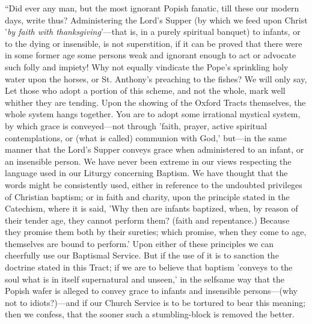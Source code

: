 ``Did ever any man, but the most ignorant Popish
fanatic, till these our modern days, write thus? Administering the
Lord's Supper (by which we feed upon Christ '\emph{by faith with
thanksgiving}'—that is, in a purely spiritual banquet) to
infants, or to the dying or insensible, is not superstition, if it can
be proved that there were in some former age some persons weak and
ignorant enough to act or advocate such folly and impiety! Why not
equally vindicate the Pope's sprinkling holy water upon the horses, or
St. Anthony's preaching to the fishes? We will only say, Let those who
adopt a portion of this scheme, and not the whole, mark well whither
they are tending. Upon the showing of the Oxford Tracts themselves,
the whole system hangs together. You are to adopt some irrational
mystical system, by which grace is conveyed—not through 'faith,
prayer, active spiritual contemplations, or (what is called) communion
with God,' but—in the same manner that the Lord's Supper conveys
grace when administered to an infant, or an insensible person. We have
never been extreme in our views respecting the language used in our
Liturgy concerning Baptism. We have thought that the words might be
consistently used, either in reference to the undoubted privileges of
Christian baptism; or in faith and charity, upon the principle
stated in the Catechism, where it is said, 'Why then are infants
baptized, when, by reason of their tender age, they cannot perform
them? (faith and repentance.) Because they promise them both by their
sureties; which promise, when they come to age, themselves are bound
to perform.' Upon either of these principles we can cheerfully use our
Baptismal Service. But if the use of it is to sanction the doctrine
stated in this Tract; if we are to believe that baptism 'conveys to
the soul what is in itself supernatural and unseen,' in the selfsame
way that the Popish wafer is alleged to convey grace to infants and
insensible persons—(why not to idiots?)—and if our Church Service
is to be tortured to bear this meaning; then we confess, that the
sooner such a stumbling-block is removed the better.

